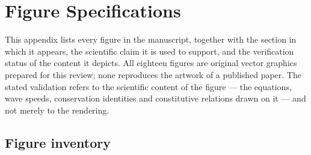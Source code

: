 \section{Figure Specifications}
\label{app:figures}

This appendix lists every figure in the manuscript, together with the section in which it appears, the scientific claim it is used to support, and the verification status of the content it depicts. All eighteen figures are original vector graphics prepared for this review; none reproduces the artwork of a published paper. The stated validation refers to the scientific content of the figure --- the equations, wave speeds, conservation identities and constitutive relations drawn on it --- and not merely to the rendering.

\subsection{Figure inventory}

